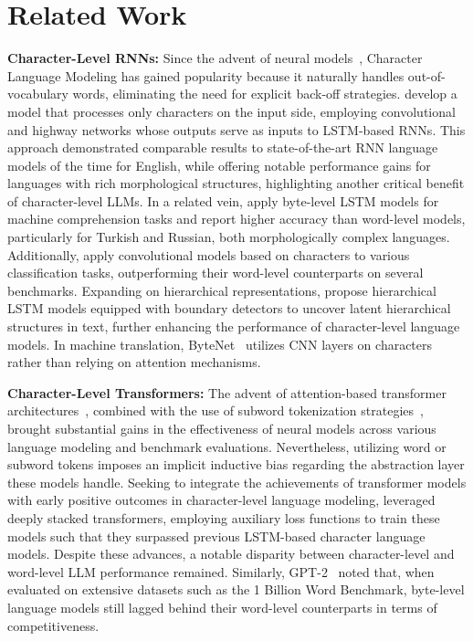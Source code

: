 \section{Related Work}
\label{section:related_work}

\textbf{Character-Level RNNs:} Since the advent of neural models~\citep{sutskever2011generating,mikolov2012subword,graves2013generating}, Character Language Modeling has gained popularity because it naturally handles out-of-vocabulary words, eliminating the need for explicit back-off strategies. \cite{kim2016character} develop a model that processes only characters on the input side, employing convolutional and highway networks whose outputs serve as inputs to LSTM-based RNNs. This approach demonstrated comparable results to state-of-the-art RNN language models of the time for English, while offering notable performance gains for languages with rich morphological structures, highlighting another critical benefit of character-level LLMs. In a related vein, \cite{kenter2018byte} apply byte-level LSTM models for machine comprehension tasks and report higher accuracy than word-level models, particularly for Turkish and Russian, both morphologically complex languages. Additionally, \cite{zhang2015character} apply convolutional models based on characters to various classification tasks, outperforming their word-level counterparts on several benchmarks. Expanding on hierarchical representations, \citet{chung2019hierarchical} propose hierarchical LSTM models equipped with boundary detectors to uncover latent hierarchical structures in text, further enhancing the performance of character-level language models. In machine translation, ByteNet~\citep{kalchbrenner2016neural} utilizes CNN layers on characters rather than relying on attention mechanisms.

\textbf{Character-Level Transformers:} The advent of attention-based transformer architectures~\citep{vaswani2017attention}, combined with the use of subword tokenization strategies~\citep{sennrich-etal-2016-neural}, brought substantial gains in the effectiveness of neural models across various language modeling and benchmark evaluations. Nevertheless, utilizing word or subword tokens imposes an implicit inductive bias regarding the abstraction layer these models handle. Seeking to integrate the achievements of transformer models with early positive outcomes in character-level language modeling, \citet{al2019character} leveraged deeply stacked transformers, employing auxiliary loss functions to train these models such that they surpassed previous LSTM-based character language models. Despite these advances, a notable disparity between character-level and word-level LLM performance remained. Similarly, GPT-2~\citep{radfordgpt2} noted that, when evaluated on extensive datasets such as the 1 Billion Word Benchmark, byte-level language models still lagged behind their word-level counterparts in terms of competitiveness.

